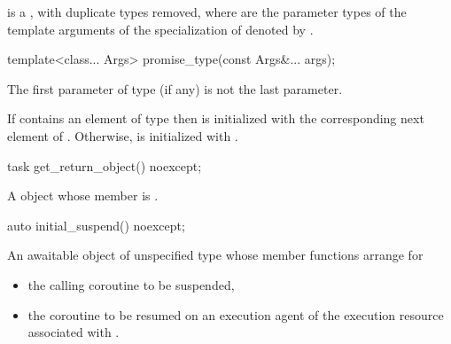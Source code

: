 \pnum
{} is a , with duplicate types removed, where 
are the parameter types of the template arguments of the specialization of
 denoted by
.

%
\begin{itemdecl}
template<class... Args>
  promise_type(const Args&... args);
\end{itemdecl}
\begin{itemdescr}
\pnum
\mandates
The first parameter of type  (if any) is not
the last parameter.

\pnum
\effects
If  contains an element of type 
then  is initialized with the corresponding next
element of .
Otherwise,  is initialized with .
\end{itemdescr}

%
\begin{itemdecl}
task get_return_object() noexcept;
\end{itemdecl}
\begin{itemdescr}
\pnum
\returns
A  object whose member  is
.
\end{itemdescr}

%
\begin{itemdecl}
auto initial_suspend() noexcept;
\end{itemdecl}
\begin{itemdescr}
\pnum
\returns
An awaitable object of unspecified type whose
member functions arrange for
\begin{itemize}
\item the calling coroutine to be suspended,
\item the coroutine to be resumed on an execution agent of the
execution resource associated with .
\end{itemize}
\end{itemdescr}

